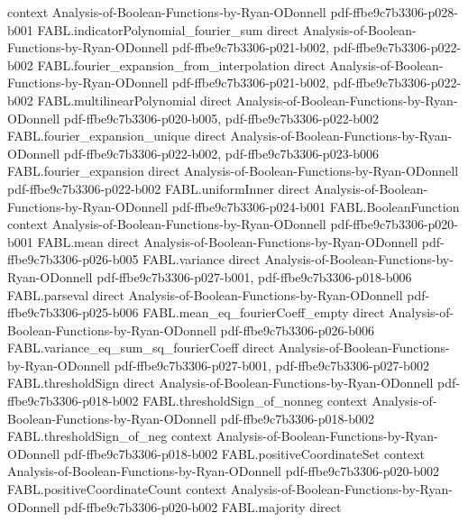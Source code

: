 \begin{theorem}
  {context}
  {Analysis-of-Boolean-Functions-by-Ryan-ODonnell}
  {pdf-ffbe9c7b3306-p028-b001}
\proofstep
  {FABL.indicatorPolynomial_fourier_sum}
  {direct}
  {Analysis-of-Boolean-Functions-by-Ryan-ODonnell}
  {pdf-ffbe9c7b3306-p021-b002,
    pdf-ffbe9c7b3306-p022-b002}
\proofstep
  {FABL.fourier_expansion_from_interpolation}
  {direct}
  {Analysis-of-Boolean-Functions-by-Ryan-ODonnell}
  {pdf-ffbe9c7b3306-p021-b002,
    pdf-ffbe9c7b3306-p022-b002}
\proofstep
  {FABL.multilinearPolynomial}
  {direct}
  {Analysis-of-Boolean-Functions-by-Ryan-ODonnell}
  {pdf-ffbe9c7b3306-p020-b005,
    pdf-ffbe9c7b3306-p022-b002}
\proofstep
  {FABL.fourier_expansion_unique}
  {direct}
  {Analysis-of-Boolean-Functions-by-Ryan-ODonnell}
  {pdf-ffbe9c7b3306-p022-b002,
    pdf-ffbe9c7b3306-p023-b006}
\proofstep
  {FABL.fourier_expansion}
  {direct}
  {Analysis-of-Boolean-Functions-by-Ryan-ODonnell}
  {pdf-ffbe9c7b3306-p022-b002}
\proofstep
  {FABL.uniformInner}
  {direct}
  {Analysis-of-Boolean-Functions-by-Ryan-ODonnell}
  {pdf-ffbe9c7b3306-p024-b001}
\proofstep
  {FABL.BooleanFunction}
  {context}
  {Analysis-of-Boolean-Functions-by-Ryan-ODonnell}
  {pdf-ffbe9c7b3306-p020-b001}
\proofstep
  {FABL.mean}
  {direct}
  {Analysis-of-Boolean-Functions-by-Ryan-ODonnell}
  {pdf-ffbe9c7b3306-p026-b005}
\proofstep
  {FABL.variance}
  {direct}
  {Analysis-of-Boolean-Functions-by-Ryan-ODonnell}
  {pdf-ffbe9c7b3306-p027-b001,
    pdf-ffbe9c7b3306-p018-b006}
\proofstep
  {FABL.parseval}
  {direct}
  {Analysis-of-Boolean-Functions-by-Ryan-ODonnell}
  {pdf-ffbe9c7b3306-p025-b006}
\proofstep
  {FABL.mean_eq_fourierCoeff_empty}
  {direct}
  {Analysis-of-Boolean-Functions-by-Ryan-ODonnell}
  {pdf-ffbe9c7b3306-p026-b006}
\proofstep
  {FABL.variance_eq_sum_sq_fourierCoeff}
  {direct}
  {Analysis-of-Boolean-Functions-by-Ryan-ODonnell}
  {pdf-ffbe9c7b3306-p027-b001,
    pdf-ffbe9c7b3306-p027-b002}
\proofstep
  {FABL.thresholdSign}
  {direct}
  {Analysis-of-Boolean-Functions-by-Ryan-ODonnell}
  {pdf-ffbe9c7b3306-p018-b002}
\proofstep
  {FABL.thresholdSign_of_nonneg}
  {context}
  {Analysis-of-Boolean-Functions-by-Ryan-ODonnell}
  {pdf-ffbe9c7b3306-p018-b002}
\proofstep
  {FABL.thresholdSign_of_neg}
  {context}
  {Analysis-of-Boolean-Functions-by-Ryan-ODonnell}
  {pdf-ffbe9c7b3306-p018-b002}
\proofstep
  {FABL.positiveCoordinateSet}
  {context}
  {Analysis-of-Boolean-Functions-by-Ryan-ODonnell}
  {pdf-ffbe9c7b3306-p020-b002}
\proofstep
  {FABL.positiveCoordinateCount}
  {context}
  {Analysis-of-Boolean-Functions-by-Ryan-ODonnell}
  {pdf-ffbe9c7b3306-p020-b002}
\proofstep
  {FABL.majority}
  {direct}

\end{theorem}
